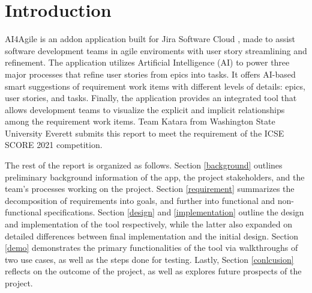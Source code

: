 \section{Introduction}
AI4Agile is an addon application built for Jira Software Cloud \cite{jira2}, made to assist software development teams in agile enviroments with user story streamlining and refinement. The application utilizes Artificial Intelligence (AI) to power three major processes that refine user stories from epics into tasks. It offers AI-based smart suggestions of requirement work items with different levels of details: epics, user stories, and tasks. Finally, the application provides an integrated tool that allows development teams to visualize the explicit and implicit relationships among the requirement work items. Team Katara from Washington State University Everett submits this report to meet the requirement of the ICSE SCORE 2021 competition. 

The rest of the report is organized as follows. Section \ref{background} outlines preliminary background information of the app, the project stakeholders, and the team's processes working on the project. Section \ref{requirement} summarizes the decomposition of requirements into goals, and further into functional and non-functional specifications. Section \ref{design} and \ref{implementation} outline the design and implementation of the tool respectively, while the latter also expanded on detailed differences between final implementation and the initial design. Section \ref{demo} demonstrates the primary functionalities of the tool via walkthroughs of two use cases, as well as the steps done for testing. Lastly, Section \ref{conlcusion} reflects on the outcome of the project, as well as explores future prospects of the project. 

